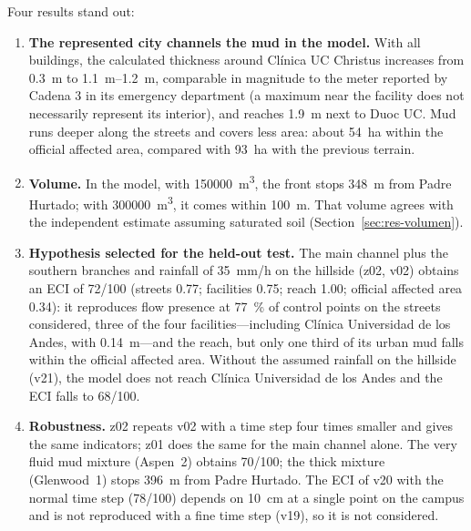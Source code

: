 Four results stand out:
\begin{enumerate}
\item \textbf{The represented city channels the mud in the model.} With all buildings, the calculated thickness around Clínica UC Christus increases from \SI{0.3}{m} to \SIrange{1.1}{1.2}{m}, comparable in magnitude to the meter reported by Cadena 3 in its emergency department \citep{cadena3_2026} (a maximum near the facility does not necessarily represent its interior), and reaches \SI{1.9}{m} next to Duoc UC. Mud runs deeper along the streets and covers less area: about \SI{54}{ha} within the official affected area, compared with \SI{93}{ha} with the previous terrain.
\item \textbf{Volume.} In the model, with \SI{150000}{m^3}, the front stops \SI{348}{m} from Padre Hurtado; with \SI{300000}{m^3}, it comes within \SI{100}{m}. That volume agrees with the independent estimate assuming saturated soil (Section~\ref{sec:res-volumen}).
\item \textbf{Hypothesis selected for the held-out test.} The main channel plus the southern branches and rainfall of \SI{35}{mm/h} on the hillside (z02, v02) obtains an ECI of 72/100 (streets 0.77; facilities 0.75; reach 1.00; official affected area 0.34): it reproduces flow presence at \SI{77}{\percent} of control points on the streets considered, three of the four facilities---including Clínica Universidad de los Andes, with \SI{0.14}{m}---and the reach, but only one third of its urban mud falls within the official affected area. Without the assumed rainfall on the hillside (v21), the model does not reach Clínica Universidad de los Andes and the ECI falls to 68/100.
\item \textbf{Robustness.} z02 repeats v02 with a time step four times smaller and gives the same indicators; z01 does the same for the main channel alone. The very fluid mud mixture (Aspen~2) obtains 70/100; the thick mixture (Glenwood~1) stops \SI{396}{m} from Padre Hurtado. The ECI of v20 with the normal time step (78/100) depends on \SI{10}{cm} at a single point on the campus and is not reproduced with a fine time step (v19), so it is not considered.
\end{enumerate}

